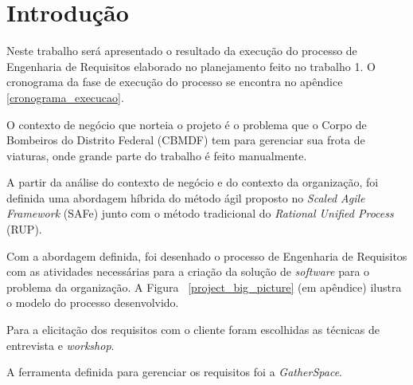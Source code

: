 \chapter[Introdução]{Introdução}
  
  
  Neste trabalho será apresentado o resultado da execução do processo de Engenharia de Requisitos elaborado no
  planejamento feito no trabalho 1. O cronograma da fase de execução do processo se encontra no apêndice \ref{cronograma_execucao}.
  
  O contexto de negócio que norteia o projeto é o problema que o Corpo de Bombeiros do Distrito Federal (CBMDF)
  tem para gerenciar sua frota de viaturas, onde grande parte do trabalho é feito manualmente.
  
  A partir da análise do contexto de negócio e do contexto da organização, foi definida uma abordagem híbrida do método
  ágil proposto no \textit{Scaled Agile Framework} (SAFe) junto com o método tradicional do \textit{Rational Unified Process} (RUP).
  
  Com a abordagem definida, foi desenhado o processo de Engenharia de Requisitos com as atividades necessárias para a criação da
  solução de \textit{software} para o problema da organização. A Figura ~\ref{project_big_picture} (em apêndice) ilustra o modelo do
  processo desenvolvido.
  
  Para a elicitação dos requisitos com o cliente foram escolhidas as técnicas de entrevista e \textit{workshop}.
  
  A ferramenta definida para gerenciar os requisitos foi a \textit{GatherSpace}.
  
  \vfill
  
  